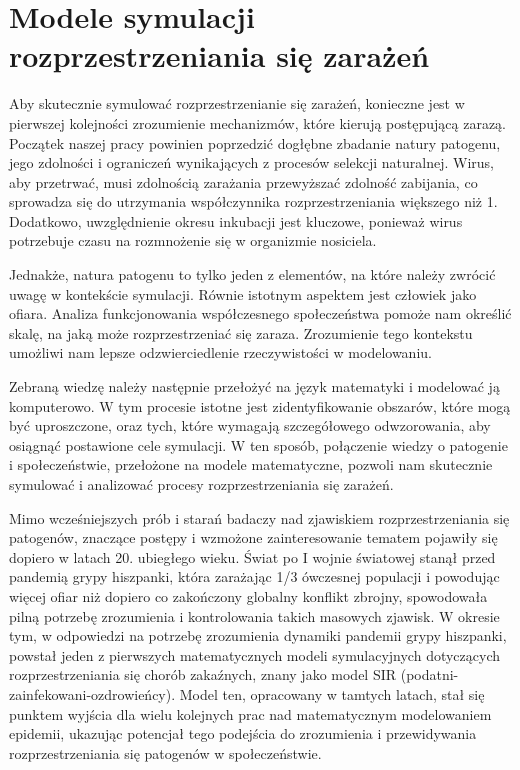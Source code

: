 \chapter{Modele symulacji rozprzestrzeniania się zarażeń}

Aby skutecznie symulować rozprzestrzenianie się zarażeń, konieczne jest w pierwszej kolejności zrozumienie mechanizmów, które kierują postępującą zarazą. Początek naszej pracy powinien poprzedzić dogłębne zbadanie natury patogenu, jego zdolności i ograniczeń wynikających z procesów selekcji naturalnej. Wirus, aby przetrwać, musi zdolnością zarażania przewyższać zdolność zabijania, co sprowadza się do utrzymania współczynnika rozprzestrzeniania większego niż 1. Dodatkowo, uwzględnienie okresu inkubacji jest kluczowe, ponieważ wirus potrzebuje czasu na rozmnożenie się w organizmie nosiciela.

Jednakże, natura patogenu to tylko jeden z elementów, na które należy zwrócić uwagę w kontekście symulacji. Równie istotnym aspektem jest człowiek jako ofiara. Analiza funkcjonowania współczesnego społeczeństwa pomoże nam określić skalę, na jaką może rozprzestrzeniać się zaraza. Zrozumienie tego kontekstu umożliwi nam lepsze odzwierciedlenie rzeczywistości w modelowaniu.

Zebraną wiedzę należy następnie przełożyć na język matematyki i modelować ją komputerowo. W tym procesie istotne jest zidentyfikowanie obszarów, które mogą być uproszczone, oraz tych, które wymagają szczegółowego odwzorowania, aby osiągnąć postawione cele symulacji. W ten sposób, połączenie wiedzy o patogenie i społeczeństwie, przełożone na modele matematyczne, pozwoli nam skutecznie symulować i analizować procesy rozprzestrzeniania się zarażeń. 

Mimo wcześniejszych prób i starań badaczy nad zjawiskiem rozprzestrzeniania się patogenów, znaczące postępy i wzmożone zainteresowanie tematem pojawiły się dopiero w latach 20. ubiegłego wieku. Świat po I wojnie światowej stanął przed pandemią grypy hiszpanki, która zarażając 1/3 ówczesnej populacji i powodując więcej ofiar niż dopiero co zakończony globalny konflikt zbrojny, spowodowała pilną potrzebę zrozumienia i kontrolowania takich masowych zjawisk. W okresie tym, w odpowiedzi na potrzebę zrozumienia dynamiki pandemii grypy hiszpanki, powstał jeden z pierwszych matematycznych modeli symulacyjnych dotyczących rozprzestrzeniania się chorób zakaźnych, znany jako model SIR (podatni-zainfekowani-ozdrowieńcy). Model ten, opracowany w tamtych latach, stał się punktem wyjścia dla wielu kolejnych prac nad matematycznym modelowaniem epidemii, ukazując potencjał tego podejścia do zrozumienia i przewidywania rozprzestrzeniania się patogenów w społeczeństwie.

